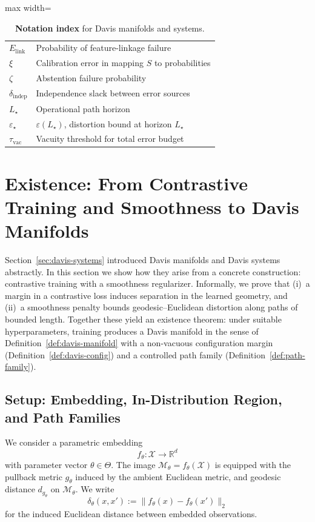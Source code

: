 \documentclass[11pt]{article}
\newcommand{\RR}{\mathbb{R}}
\theoremstyle{remark}
\theoremstyle{plain}
\begin{document}
\begin{table}[t]
\begin{adjustbox}{max width=\linewidth}
\begin{tabular}{ll}
        $E_{\text{link}}$ & Probability of feature-linkage failure \\
        $\xi$ & Calibration error in mapping $S$ to probabilities \\
        $\zeta$ & Abstention failure probability \\
        $\delta_{\text{indep}}$ & Independence slack between error sources \\
        $L_\star$ & Operational path horizon \\
        $\varepsilon_\star$ & $\varepsilon(L_\star)$, distortion bound at horizon $L_\star$ \\
        $\tau_{\text{vac}}$ & Vacuity threshold for total error budget \\
        \bottomrule
    \end{tabular}
    \end{adjustbox}
    \caption{\textbf{Notation index} for Davis manifolds and systems.}
    \label{tab:notation}
\end{table}

\section{Existence: From Contrastive Training and Smoothness to Davis Manifolds}
\label{sec:existence}

Section~\ref{sec:davis-systems} introduced Davis manifolds and Davis systems abstractly. In this
section we show how they arise from a concrete construction: contrastive training with a smoothness
regularizer. Informally, we prove that
(i)~a margin in a contrastive loss induces separation in the learned geometry, and
(ii)~a smoothness penalty bounds geodesic--Euclidean distortion along paths of bounded length.
Together these yield an existence theorem: under suitable hyperparameters, training produces a
Davis manifold in the sense of Definition~\ref{def:davis-manifold} with a non-vacuous configuration
margin (Definition~\ref{def:davis-config}) and a controlled path family
(Definition~\ref{def:path-family}).

\subsection{Setup: Embedding, In-Distribution Region, and Path Families}
\label{subsec:existence-setup}

We consider a parametric embedding
\[
f_\theta : \mathcal{X} \to \RR^d
\]
with parameter vector $\theta \in \Theta$. The image $\mathcal{M}_\theta = f_\theta(\mathcal{X})$ is
equipped with the pullback metric $g_\theta$ induced by the ambient Euclidean metric, and geodesic
distance $d_{g_\theta}$ on $\mathcal{M}_\theta$. We write
\[
\delta_\theta(x,x') := \bigl\| f_\theta(x) - f_\theta(x') \bigr\|_2
\]
for the induced Euclidean distance between embedded observations.
\end{document}
